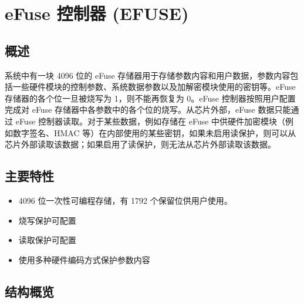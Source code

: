 \documentclass[main\_\_CN.tex]{subfiles}
\begin{document}

\ifglobal
\else
    \listoftodos
    {\let\clearpage\relax \listofdonetodos}
    \tableofcontents
\fi



\hypertarget{efuse}{}
\chapter{eFuse 控制器 (EFUSE)}
\label{mod:efuse}

\section{概述}

\chipname{} 系统中有一块 4096 位的 eFuse 存储器用于存储参数内容和用户数据，参数内容包括一些硬件模块的控制参数、系统数据参数以及加解密模块使用的密钥等。eFuse 存储器的各个位一旦被烧写为 1，则不能再恢复为 0。eFuse 控制器按照用户配置完成对 eFuse 存储器中各参数中的各个位的烧写。从芯片外部，eFuse 数据只能通过 eFuse 控制器读取。对于某些数据，例如存储在 eFuse 中供硬件加密模块（例如数字签名、HMAC 等）在内部使用的某些密钥，如果未启用读保护，则可以从芯片外部读取该数据；如果启用了读保护，则无法从芯片外部读取该数据。


\section{主要特性}

\begin{itemize}
    \item 4096 位一次性可编程存储，有 1792 个保留位供用户使用。
    \item 烧写保护可配置
    \item 读取保护可配置
    \item 使用多种硬件编码方式保护参数内容
\end{itemize}


\section{结构概览}
\end{document}

